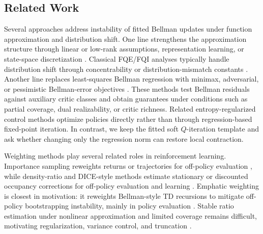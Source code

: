 \documentclass{article}
\theoremstyle{plain}
\theoremstyle{definition}
\theoremstyle{remark}
\begin{document}
\subsection{Related Work}

Several approaches address instability of fitted Bellman updates under function
approximation and distribution shift. One line strengthens the approximation
structure through linear or low-rank assumptions, representation learning, or
state-space discretization
\citep{melo2007convergence,duan2020minimax,yang2020reinforcement,
jin2023provably,chang2022learning,peng1993convergence,van2006performance,
xie2021batch}. Classical FQE/FQI analyses typically handle distribution shift through
concentrability or distribution-mismatch constants
\citep{munos2008finite,scherrer2014approximate,fan2020theoretical,
xie2022role}. Another line replaces least-squares Bellman regression with
minimax, adversarial, or pessimistic Bellman-error objectives
\citep{uehara2020minimax,jin2021bellman,xie2021batch,uehara2023offline,
xie2021bellman}. These methods test Bellman residuals against auxiliary critic
classes and obtain guarantees under conditions such as partial coverage, dual
realizability, or critic richness. Related entropy-regularized control methods
\citep{ziebart2008maximum,haarnoja2018soft,geist2019theory,neu2017unified,
zhan2023policy,lan2023policy}
optimize policies directly rather than through regression-based fixed-point
iteration. In contrast, we keep the fitted soft \(Q\)-iteration template and ask
whether changing only the regression norm can restore local contraction.

Weighting methods play several related roles in reinforcement learning.
Importance sampling reweights returns or trajectories for off-policy evaluation
\citep{precup2000eligibility,precup2001off,thomas2016data,de2023value}, while
density-ratio and DICE-style methods estimate stationary or discounted occupancy
corrections for off-policy evaluation and learning
\citep{liu2018breaking,hallak2017consistent,nachum2019dualdice,
zhang2020gendice,uehara2020minimax}. Emphatic weighting is closest in
motivation: it reweights Bellman-style TD recursions to mitigate off-policy
bootstrapping instability, mainly in policy evaluation
\citep{yu2012weighted,mahmood2015emphatic,sutton2016emphatic,
hallak2016generalized,yu2018generalized,patterson2022generalized}.
Stable ratio estimation under nonlinear approximation and limited coverage
remains difficult, motivating regularization, variance control, and truncation
\citep{zhang2022truncated,mehrabi2024off,uehara2021finite}.
\end{document}
